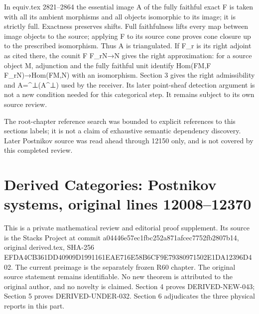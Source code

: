 \documentclass[11pt]{article}
\begin{document}
In equiv.tex 2821–\allowbreak{}2864 the essential image A of the fully faithful exact F is taken with all its ambient morphisms and all objects isomorphic to its image; it is strictly full. Exactness preserves shifts. Full faithfulness lifts every map between image objects to the source; applying F to its source cone proves cone closure up to the prescribed isomorphism. Thus A is triangulated. If F\_\allowbreak{}r is its right adjoint as cited there,\allowbreak{} the counit F F\_\allowbreak{}rN\allowbreak{}→N gives the right approximation:\allowbreak{} for a source object M,\allowbreak{} adjunction and the fully faithful unit identify Hom(FM,\allowbreak{}F F\_\allowbreak{}rN)\allowbreak{}\allowbreak{}→Hom(FM,\allowbreak{}N)\allowbreak{} with an isomorphism. Section 3 gives the right admissibility and A\allowbreak{}=\textasciicircum{}⊥(A\textasciicircum{}⊥)\allowbreak{} used by the receiver. Its later point-sheaf detection argument is not a new condition needed for this categorical step. It remains subject to its own source review.

The root-chapter reference search was bounded to explicit references to this section\textquotesingle s labels; it is not a claim of exhaustive semantic dependency discovery. Later Postnikov source was read ahead through 12150 only,\allowbreak{} and is not covered by this completed review.
\clearpage
\section{\texorpdfstring{Derived Categories:\allowbreak{} Postnikov systems,\allowbreak{} original lines 12008–\allowbreak{}12370}{Derived  Postnikov  original lines }}\label{proofs-12008-12370-derived-categories-postnikov-systems-original-lines-1200812370}

This is a private mathematical review and editorial proof supplement. Its source is the Stacks Project at commit a04446e5\allowbreak{}7ec1fbc2\allowbreak{}52a871af\allowbreak{}cec7752f\allowbreak{}b2807b14, original derived.tex,\allowbreak{} SHA-256 EFDA4CB3\allowbreak{}61DD4090\allowbreak{}9D199116\allowbreak{}1EAE716E\allowbreak{}58B6CF9E\allowbreak{}79380971\allowbreak{}502E1DA1\allowbreak{}2396D402. The current preimage is the separately frozen R60 chapter. The original source statement remains identifiable. No new theorem is attributed to the original author,\allowbreak{} and no novelty is claimed. Section 4 proves DERIVED-NEW-043; Section 5 proves DERIVED-UNDER-032. Section 6 adjudicates the three physical reports in this part.
\end{document}
